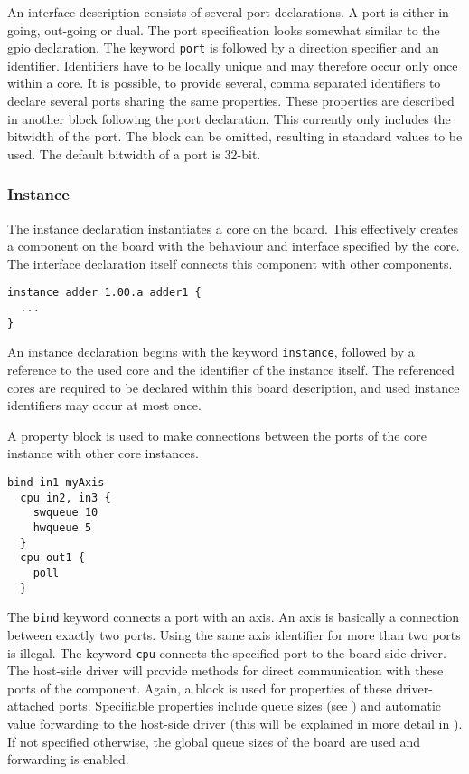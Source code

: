 \documentclass{report}
\begin{document}
An interface description consists of several port declarations. A port is either in-going, out-going or dual. The port specification looks somewhat similar to the gpio declaration. The keyword \texttt{port} is followed by a direction specifier and an identifier. Identifiers have to be locally unique and may therefore occur only once within a core. It is possible, to provide several, comma separated identifiers to declare several ports sharing the same properties. These properties are described in another block following the port declaration. This currently only includes the bitwidth of the port. The block can be omitted, resulting in standard values to be used. The default bitwidth of a port is 32-bit.

\subsubsection{Instance}
The instance declaration instantiates a core on the board. This effectively creates a component on the board with the behaviour and interface specified by the core. The interface declaration itself connects this component with other components.

\begin{lstlisting}[language=bdl]
instance adder 1.00.a adder1 {
  ...
}
\end{lstlisting}

An instance declaration begins with the keyword \texttt{instance}, followed by a reference to the used core and the identifier of the instance itself. The referenced cores are required to be declared within this board description, and used instance identifiers may occur at most once.

A property block is used to make connections between the ports of the core instance with other core instances.

\begin{lstlisting}[language=bdl]
  bind in1 myAxis
  cpu in2, in3 {
    swqueue 10
    hwqueue 5
  }
  cpu out1 {
    poll
  }
\end{lstlisting}

The \texttt{bind} keyword connects a port with an axis. An axis is basically a connection between exactly two ports. Using the same axis identifier for more than two ports is illegal.
The keyword \texttt{cpu} connects the specified port to the board-side driver. %
The host-side driver will provide methods for direct communication with these ports of the component.
Again, a block is used for properties of these driver-attached ports. Specifiable properties include queue sizes (see ) and automatic value forwarding to the host-side driver (this will be explained in more detail in ). If not specified otherwise, the global queue sizes of the board are used and forwarding is enabled.
\end{document}
